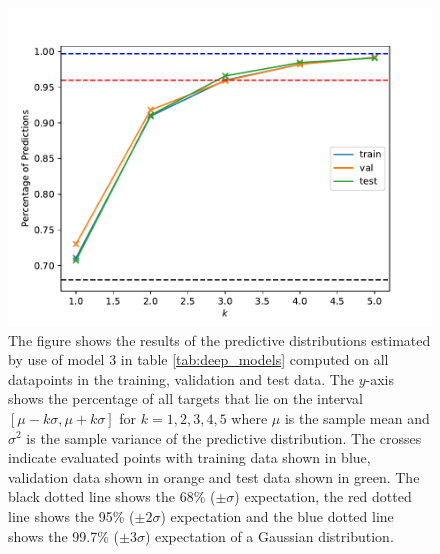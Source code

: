 \begin{figure}[H]
    \centering
    \includegraphics[scale=0.7]{figures/confidence_estimation/good_vs_bad_cases_confidence.pdf}
    \caption{
        The figure shows the results of the predictive distributions estimated by use of model 3 in table \ref{tab:deep_models}
        computed on all datapoints in the training, validation and test data. The $y$-axis shows the percentage of all targets that lie on the interval $[\mu - k\sigma, \mu + k\sigma]$ for $k=1,2,3,4,5$ where $\mu$ is the sample mean and $\sigma^2$ is the sample variance of the predictive distribution. The crosses indicate evaluated points with training data shown in blue, validation data shown in orange and test data shown in green. The black dotted line shows the 68\% ($\pm \sigma$) expectation, the red dotted line shows the 95\% ($\pm 2\sigma$) expectation and the blue dotted line shows the 99.7\% ($\pm 3 \sigma$) expectation of a Gaussian distribution.
    }
    \label{fig:confidence}
\end{figure}







